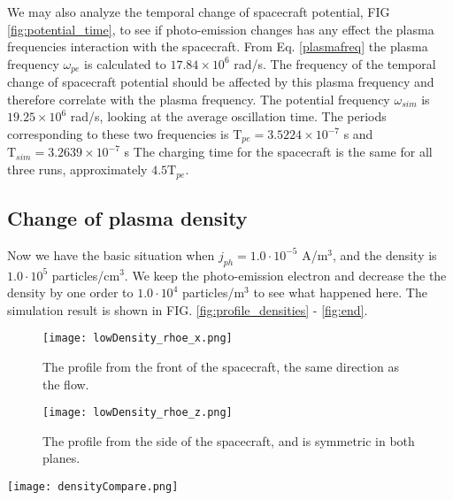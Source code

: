 \documentclass[aip, 
rsi, 
amsmath,
amssymb,
longbibliography,
reprint]{revtex4-1}
\begin{document}
We may also analyze the temporal change of spacecraft potential, FIG \ref{fig:potential_time}, to see if photo-emission changes has any effect the plasma frequencies interaction with the spacecraft.  From Eq. \ref{plasmafreq} the plasma frequency $\omega_{pe}$ is calculated to $17.84 \times 10^6$ rad/s. The frequency of the temporal change of spacecraft potential should be affected by this plasma frequency and therefore correlate with the plasma frequency. The potential frequency $\omega_{sim}$ is $19.25 \times 10^6$ rad/s, looking at the average oscillation time. The periods corresponding to these two frequencies is $\mathrm{T}_{pe} = 3.5224 \times 10^{-7}$ s and $\mathrm{T}_{sim} = 3.2639 \times 10^{-7}$ s The charging time for the spacecraft is the same for all three runs, approximately $4.5\mathrm{T}_{pe}$.

\subsection{Change of plasma density}

Now we have the basic situation when $j_{ph}= 1.0\cdot10^{-5}$ A/m$^3$, and the density is $1.0\cdot10^5$ particles/cm$^3$. We keep the photo-emission electron and decrease the the density by one order to $1.0\cdot10^4$ particles/m$^3$ to see what happened here. The simulation result is shown in FIG. \ref{fig:profile_densities} - \ref{fig:end}.\\

\begin{figure*}
\begin{subfigure}{0.45\textwidth}
\texttt{[image: lowDensity\_rhoe\_x.png]}
\caption{The profile from the front of the spacecraft, the same direction as the flow.}
\end{subfigure}
\begin{subfigure}{0.45\textwidth}
\texttt{[image: lowDensity\_rhoe\_z.png]}
\caption{The profile from the side of the spacecraft, and is symmetric in both planes.}
\end{subfigure}
\caption{The situation when we have lowered the density by an order of 1 and the photo-emission is $j_{ph} = 10^{-5}$ A/m$^3$} \label{fig:profile_densities}
\end{figure*}

\begin{figure*}
\texttt{[image: densityCompare.png]}
\caption{Relation between ion and electron density for different densities and same current.The red line shows Low density $j_{ph} = 10^{-5}$ A/m$^3$,the blue one shows high density $j_{ph} = 10^{-4}$ A/m$^3$} \label{fig:densitycompare}
\end{figure*}
\end{document}
